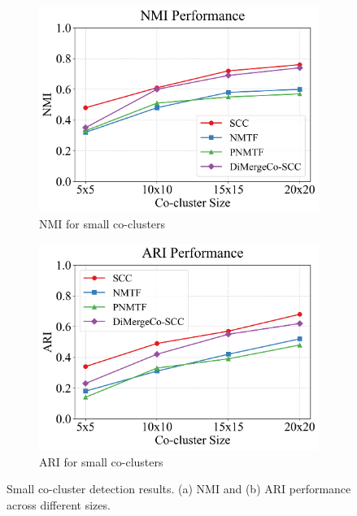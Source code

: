 \documentclass[journal]{IEEEtran}
\theoremstyle{definition}
\theoremstyle{remark} %
\begin{document}
\begin{figure}[t]
    \centering
    \begin{subfigure}[b]{0.48\textwidth}
        \centering
        \includegraphics[width=\linewidth]{images/nmi_small.png}
        \caption{NMI for small co-clusters}
        \label{fig:nmi_small}
    \end{subfigure}
    \hfill
    \begin{subfigure}[b]{0.48\textwidth}
        \centering
        \includegraphics[width=\linewidth]{images/ari_small.png}
        \caption{ARI for small co-clusters}
        \label{fig:ari_small}
    \end{subfigure}
    \caption{Small co-cluster detection results. (a) NMI and (b) ARI performance across different sizes.}
    \label{fig:small-co-cluster-detection}
\end{figure}
\end{document}

